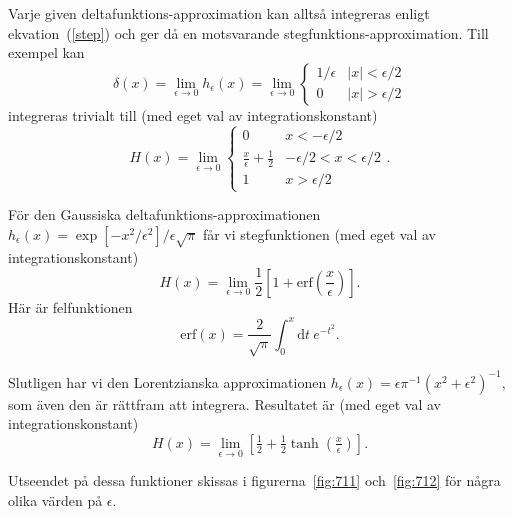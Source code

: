 \documentclass[%
oneside,                 %
final,                   %
10pt]{article}
\newenvironment{doconceexercise}{}{}
\begin{document}
\begin{doconceexercise}
Varje given deltafunktions-approximation kan alltså integreras enligt ekvation~(\ref{step}) och ger då en motsvarande stegfunktions-approximation. Till exempel kan
\begin{equation}
    \delta(x)=\lim_{\epsilon\rightarrow 0}h_\epsilon(x) =\lim_{\epsilon\rightarrow 0}\left\{\begin{array}{cc}
        1/\epsilon & |x| < \epsilon/2 \\
        0 & |x| > \epsilon/2
    \end{array} \right.
\end{equation}
integreras trivialt till (med eget val av integrationskonstant)
\begin{equation}
    H(x)=\lim_{\epsilon\rightarrow 0}\left\{\begin{array}{cc}
        0 & x < -\epsilon/2 \\
        \frac{x}{\epsilon}+\frac{1}{2} & -\epsilon/2<x<\epsilon/2 \\
        1 & x > \epsilon/2
    \end{array} \right..
\end{equation}

För den Gaussiska deltafunktions-approximationen $h_\epsilon(x) =\exp\left[-x^2/\epsilon^2\right]/\epsilon\sqrt\pi$ får vi stegfunktionen (med eget val av integrationskonstant)
\begin{equation}
H(x)=\lim_{\epsilon\rightarrow 0}\frac{1}{2}\left[1+\mathrm{erf}\left(\frac{ x}{\epsilon}\right)\right].
\end{equation}
Här är felfunktionen
\begin{equation}
    \mathrm{erf}(x)=\frac2{\sqrt\pi}\int_0^x\mathrm dt\ e^{-t^2}.
\end{equation}

Slutligen har vi den Lorentzianska approximationen $h_\epsilon(x)=\epsilon\pi^{-1}(x^2+\epsilon^2)^{-1}$, som även den är rättfram att integrera. Resultatet är (med eget val av integrationskonstant)
\begin{equation}
H(x)=\lim_{\epsilon\rightarrow 0}\left[\tfrac12+\tfrac12\tanh\left(\tfrac x\epsilon\right)\right].
\end{equation}

Utseendet på dessa funktioner skissas i figurerna~\ref{fig:711} och~\ref{fig:712} för några olika värden på $\epsilon$.



\end{doconceexercise}
\end{document}
